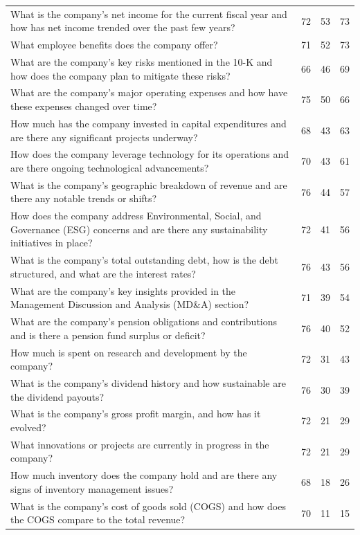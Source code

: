 \begin{longtable}{L{0.6\textwidth}rrr}
What is the company's net income for the current fiscal year and how has net income trended over the past few years? & 72 & 53 & 73 \\
What employee benefits does the company offer? & 71 & 52 & 73 \\
What are the company's key risks mentioned in the 10-K and how does the company plan to mitigate these risks? & 66 & 46 & 69 \\
What are the company's major operating expenses and how have these expenses changed over time? & 75 & 50 & 66 \\
How much has the company invested in capital expenditures and are there any significant projects underway? & 68 & 43 & 63 \\
How does the company leverage technology for its operations and are there ongoing technological advancements? & 70 & 43 & 61 \\
What is the company's geographic breakdown of revenue and are there any notable trends or shifts? & 76 & 44 & 57 \\
How does the company address Environmental, Social, and Governance (ESG) concerns and are there any sustainability initiatives in place? & 72 & 41 & 56 \\
What is the company's total outstanding debt, how is the debt structured, and what are the interest rates? & 76 & 43 & 56 \\
What are the company's key insights provided in the Management Discussion and Analysis (MD\&A) section? & 71 & 39 & 54 \\
What are the company's pension obligations and contributions and is there a pension fund surplus or deficit? & 76 & 40 & 52 \\
How much is spent on research and development by the company? & 72 & 31 & 43 \\
What is the company's dividend history and how sustainable are the dividend payouts? & 76 & 30 & 39 \\
What is the company's gross profit margin, and how has it evolved? & 72 & 21 & 29 \\
What innovations or projects are currently in progress in the company? & 72 & 21 & 29 \\
How much inventory does the company hold and are there any signs of inventory management issues? & 68 & 18 & 26 \\
What is the company's cost of goods sold (COGS) and how does the COGS compare to the total revenue? & 70 & 11 & 15 \\

\end{longtable}
